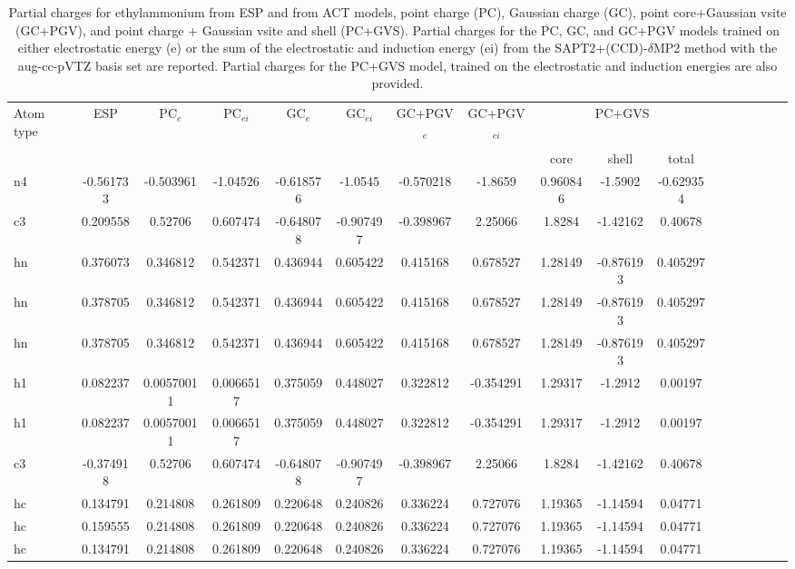 \begin{sidewaystable}
\caption{Partial charges for ethylammonium from ESP and from ACT models, point charge (PC), Gaussian charge (GC), point core+Gaussian vsite (GC+PGV), and point charge + Gaussian vsite and shell (PC+GVS).  Partial charges for the PC, GC, and GC+PGV models trained on either electrostatic energy (e) or the sum of the electrostatic and induction energy (ei) from the SAPT2+(CCD)-$\delta$MP2 method with the aug-cc-pVTZ basis set are reported. Partial charges for the PC+GVS model, trained on the electrostatic and induction energies are also provided.}
\hspace{-1cm}
\begin{tabular}{lcccccccccccccccc}
\hline
 Atom type & ESP & PC$_{e}$ & PC$_{ei}$ & GC$_{e}$ & GC$_{ei}$ & GC+PGV$_{e}$ & GC+PGV$_{ei}$ & \multicolumn{3}{c}{PC+GVS} \\\\
 & & & & & & & & core & shell & total \\
\hline
 n4 & -0.561733 & -0.503961 & -1.04526 & -0.618576 &  -1.0545 & -0.570218 &  -1.8659 & 0.960846 & -1.5902 & -0.629354 \\
 c3 & 0.209558 & 0.52706 & 0.607474 & -0.648078 &  -0.907497 & -0.398967 &  2.25066 & 1.8284 & -1.42162 & 0.40678 \\
 hn & 0.376073 & 0.346812 & 0.542371 & 0.436944 &  0.605422 & 0.415168 &  0.678527 & 1.28149 & -0.876193 & 0.405297 \\
 hn & 0.378705 & 0.346812 & 0.542371 & 0.436944 &  0.605422 & 0.415168 &  0.678527 & 1.28149 & -0.876193 & 0.405297 \\
 hn & 0.378705 & 0.346812 & 0.542371 & 0.436944 &  0.605422 & 0.415168 &  0.678527 & 1.28149 & -0.876193 & 0.405297 \\
 h1 & 0.082237 & 0.00570011 & 0.0066517 & 0.375059 &  0.448027 & 0.322812 &  -0.354291 & 1.29317 & -1.2912 & 0.00197 \\
 h1 & 0.082237 & 0.00570011 & 0.0066517 & 0.375059 &  0.448027 & 0.322812 &  -0.354291 & 1.29317 & -1.2912 & 0.00197 \\
 c3 & -0.374918 & 0.52706 & 0.607474 & -0.648078 &  -0.907497 & -0.398967 &  2.25066 & 1.8284 & -1.42162 & 0.40678 \\
 hc & 0.134791 & 0.214808 & 0.261809 & 0.220648 &  0.240826 & 0.336224 &  0.727076 & 1.19365 & -1.14594 & 0.04771 \\
 hc & 0.159555 & 0.214808 & 0.261809 & 0.220648 &  0.240826 & 0.336224 &  0.727076 & 1.19365 & -1.14594 & 0.04771 \\
 hc & 0.134791 & 0.214808 & 0.261809 & 0.220648 &  0.240826 & 0.336224 &  0.727076 & 1.19365 & -1.14594 & 0.04771 \\
\hline
\end{tabular}
\end{sidewaystable}
